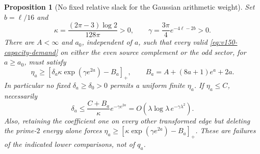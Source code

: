 \documentclass[11pt]{article}
\newtheorem{proposition}[theorem]{Proposition}
\theoremstyle{remark}
\begin{document}
\begin{proposition}[No fixed relative slack for the Gaussian arithmetic weight]
\label{prop:v150-capacity-slack}
Set $b=\ell/16$ and
\[
 \kappa=\frac{(2\pi-3)\log2}{128\pi}>0,\qquad
 \gamma=\frac{3\pi}{4}e^{-4\ell-2b}>0.
\]
There are $A<\infty$ and $a_0$, independent of $a$, such that every
valid \eqref{eq:v150-capacity-demand} on either the even source
complement or the odd sector, for $a\ge a_0$, must satisfy
\begin{equation}\label{eq:v150-slack-budget}
 \eta_a\ge\left[\delta_a\kappa\exp(\gamma e^{2a})-B_a\right]_+,
 \qquad B_a=A+(8a+1)e^a+2a.
\end{equation}
In particular no fixed $\delta_a\ge\delta_0>0$ permits a uniform
finite $\eta_a$. If $\eta_a\le C$, necessarily
\begin{equation}\label{eq:v150-slack-rate}
 \delta_a\le\frac{C+B_a}{\kappa}e^{-\gamma e^{2a}}
       =O(\lambda\log\lambda\,e^{-\gamma\lambda^2}).
\end{equation}
Also, retaining the coefficient one on every other transformed edge
but deleting the prime-$2$ energy alone forces
$\eta_a\ge[\kappa\exp(\gamma e^{2a})-B_a]_+$.
These are failures of the indicated lower comparisons, not of $q_a$.
\end{proposition}
\end{document}
